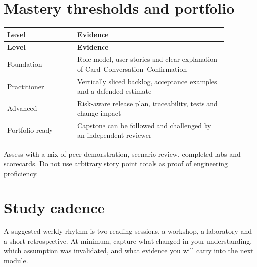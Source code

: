 \documentclass[11pt,letterpaper]{article}
\begin{document}
\section{Mastery thresholds and portfolio}
\begin{longtable}{|>{\raggedright\arraybackslash}p{0.28\linewidth}|>{\raggedright\arraybackslash}p{0.60\linewidth}|}\hline
\textbf{Level} & \textbf{Evidence} \\ \hline\endfirsthead\hline
\textbf{Level} & \textbf{Evidence} \\ \hline\endhead
Foundation & Role model, user stories and clear explanation of Card–Conversation–Confirmation \\ \hline
Practitioner & Vertically sliced backlog, acceptance examples and a defended estimate \\ \hline
Advanced & Risk-aware release plan, traceability, tests and change impact \\ \hline
Portfolio-ready & Capstone can be followed and challenged by an independent reviewer \\ \hline
\end{longtable}
Assess with a mix of peer demonstration, scenario review, completed labs and scorecards. Do not use arbitrary story point totals as proof of engineering proficiency.

\section{Study cadence}
A suggested weekly rhythm is two reading sessions, a workshop, a laboratory and a short retrospective. At minimum, capture what changed in your understanding, which assumption was invalidated, and what evidence you will carry into the next module.
\end{document}
